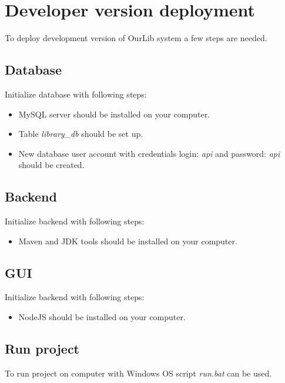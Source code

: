 \section{Developer version deployment}
To deploy development version of OurLib system a few steps are needed.

\subsection{Database}
Initialize database with following steps:
\begin{itemize}
    \item MySQL server should be installed on your computer. 
    \item Table \textit{library\_db} should be set up. 
    \item New database user account with credentials login: \textit{api} and password:  \textit{api} should be created.
\end{itemize}

\subsection{Backend}
Initialize backend with following steps:
\begin{itemize}
    \item Maven and JDK tools should be installed on your computer.
\end{itemize}

\subsection{GUI}
Initialize backend with following steps:
\begin{itemize}
    \item NodeJS should be installed on your computer.
\end{itemize}

\subsection{Run project}
To run project on computer with Windows OS script \textit{run.bat} can be used. 